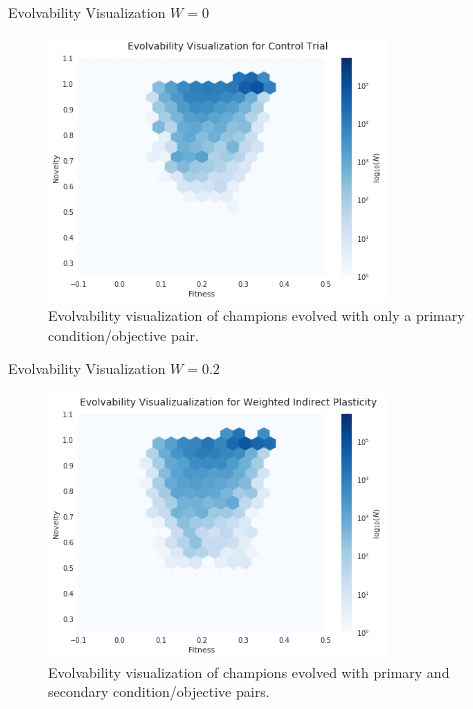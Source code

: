 \begin{frame}{Evolvability Visualization $W=0$} 
\begin{figure}
    \centering
    \includegraphics[width=0.8\textwidth]{img/ev_w0}
 	\captionsetup{singlelinecheck=off,justification=raggedright}
  	\caption{Evolvability visualization of champions evolved with only a primary condition/objective pair.}
    \label{fig:ev_w0}
\end{figure}
\end{frame}

\begin{frame}{Evolvability Visualization $W=0.2$}
\begin{figure}
    \centering
    \includegraphics[width=0.8\textwidth]{img/ev_w0_2}
 	\captionsetup{singlelinecheck=off,justification=raggedright}
  	\caption{Evolvability visualization of champions evolved with primary and secondary condition/objective pairs.}
    \label{fig:es_w0_2}
\end{figure}
\end{frame}


